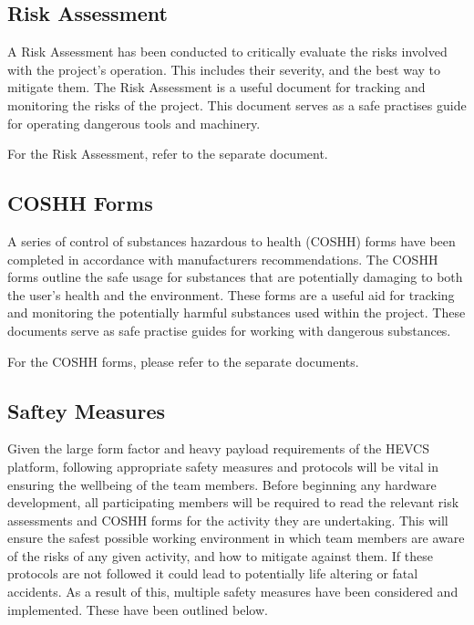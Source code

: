\documentclass [12pt]{article}
\begin{document}
\subsection{Risk Assessment}\label{sec:risk_assessment}

A Risk Assessment has been conducted to critically evaluate the risks involved with the project's operation. This includes their severity, and the best way to mitigate them.
The Risk Assessment is a useful document for tracking and monitoring the risks of the project.
This document serves as a safe practises guide for operating dangerous tools and machinery.


For the Risk Assessment, refer to the separate document.

\subsection{COSHH Forms}\label{sec:coshh_forms}

A series of control of substances hazardous to health (COSHH) forms have been completed in accordance with manufacturers recommendations.
The COSHH forms outline the safe usage for substances that are potentially damaging to both the user's health and the environment.
These forms are a useful aid for tracking and monitoring the potentially harmful substances used within the project.
These documents serve as safe practise guides for working with dangerous substances.


For the COSHH forms, please refer to the separate documents.

\subsection{Saftey Measures}\label{sec:safety_measures}

Given the large form factor and heavy payload requirements of the HEVCS platform, following appropriate safety measures and protocols will be vital in ensuring the wellbeing of the team members.
Before beginning any hardware development, all participating members will be required to read the relevant risk assessments and COSHH forms for the activity they are undertaking.
This will ensure the safest possible working environment in which team members are aware of the risks of any given activity, and how to mitigate against them.
If these protocols are not followed it could lead to potentially life altering or fatal accidents.
As a result of this, multiple safety measures have been considered and implemented.
These have been outlined below.
\end{document}
